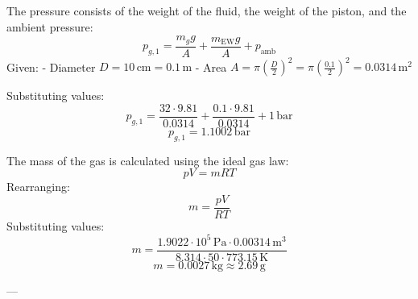 The pressure consists of the weight of the fluid, the weight of the piston, and the ambient pressure:  
\[
p_{g,1} = \frac{m_g g}{A} + \frac{m_{\text{EW}} g}{A} + p_{\text{amb}}
\]  
Given:  
- Diameter \( D = 10 \, \text{cm} = 0.1 \, \text{m} \)  
- Area \( A = \pi \left(\frac{D}{2}\right)^2 = \pi \left(\frac{0.1}{2}\right)^2 = 0.0314 \, \text{m}^2 \)  

Substituting values:  
\[
p_{g,1} = \frac{32 \cdot 9.81}{0.0314} + \frac{0.1 \cdot 9.81}{0.0314} + 1 \, \text{bar}
\]  
\[
p_{g,1} = 1.1002 \, \text{bar}
\]  

The mass of the gas is calculated using the ideal gas law:  
\[
pV = mRT
\]  
Rearranging:  
\[
m = \frac{pV}{RT}
\]  
Substituting values:  
\[
m = \frac{1.9022 \cdot 10^5 \, \text{Pa} \cdot 0.00314 \, \text{m}^3}{8.314 \cdot 50 \cdot 773.15 \, \text{K}}
\]  
\[
m = 0.0027 \, \text{kg} \approx 2.69 \, \text{g}
\]  

---